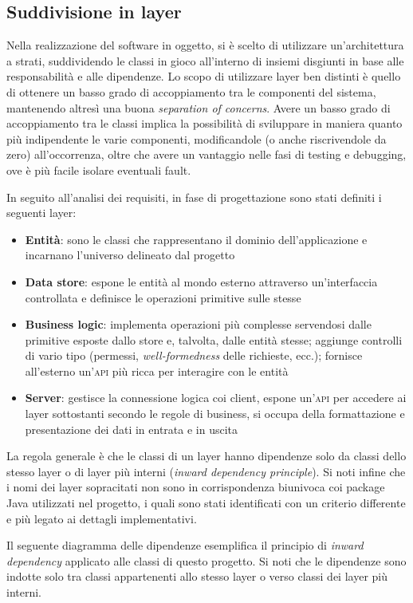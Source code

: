 \documentclass[a4paper,8pt]{article} %
\begin{document}
\subsection{Suddivisione in layer}
Nella realizzazione del software in oggetto, si è scelto di utilizzare un'architettura a strati, suddividendo le classi in gioco
all'interno di insiemi disgiunti in base alle responsabilità e alle dipendenze. Lo scopo di utilizzare layer ben distinti è quello
di ottenere un basso grado di accoppiamento tra le componenti del sistema, mantenendo altresì una buona  \emph{separation of concerns}.
Avere un basso grado di accoppiamento tra le classi implica la possibilità di sviluppare in maniera quanto più indipendente
le varie componenti, modificandole (o anche riscrivendole da zero) all'occorrenza, oltre che avere un vantaggio nelle fasi di testing e debugging, ove è
più facile isolare eventuali fault.
\par
In seguito all'analisi dei requisiti, in fase di progettazione sono stati definiti i seguenti layer:
\begin{itemize}
    \item \textbf{Entità}: sono le classi che rappresentano il dominio dell'applicazione e incarnano l'universo delineato dal progetto
    \item \textbf{Data store}: espone le entità al mondo esterno attraverso un'interfaccia controllata e definisce le operazioni primitive sulle stesse
    \item \textbf{Business logic}: implementa operazioni più complesse servendosi dalle primitive esposte dallo store e, talvolta, dalle entità stesse;
          aggiunge controlli di vario tipo (permessi, \emph{well-formedness} delle richieste, ecc.); fornisce all'esterno un'\textsc{api} più ricca per interagire con le entità
    \item \textbf{Server}: gestisce la connessione logica coi client, espone un'\textsc{api} per accedere ai layer sottostanti secondo le regole di business, si occupa della
          formattazione e presentazione dei dati in entrata e in uscita
\end{itemize}
La regola generale è che le classi di un layer hanno dipendenze solo da classi dello stesso layer o di layer più interni (\emph{inward dependency principle}).
Si noti infine che i nomi dei layer sopracitati non sono in corrispondenza biunivoca coi package Java utilizzati nel progetto, i quali sono stati
identificati con un criterio differente e più legato ai dettagli implementativi.
\par
Il seguente diagramma delle dipendenze esemplifica il principio di \emph{inward dependency} applicato alle classi di questo progetto. Si noti che le dipendenze sono indotte solo tra classi appartenenti allo stesso
layer o verso classi dei layer più interni.
\end{document}
